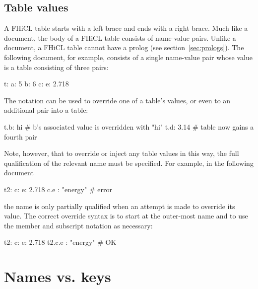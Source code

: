 \documentclass{memarticle}
\newcommand{\fhicl}{FHiCL\xspace}
\begin{document}
\section{Table values}

A \fhicl table starts with a left brace and ends with a right brace.
Much like a document, the body of a \fhicl table consists of
name-value pairs.  Unlike a document, a \fhicl table cannot have a
prolog (see section~\ref{sec:prologs}).  The following document, for example, consists of a single
name-value pair whose value is a table consisting of three pairs:
%
\Needspace{0.67in}
\begin{fcllisting}[texcl,escapechar=`]
t: {
   a: 5
   b: 6
   c: { e: 2.718 }
}
\end{fcllisting}

The  notation can be used to override one of a table's values,
or even to  an additional pair into a table:
%
\Needspace{0.34in}
\begin{fcllisting}[texcl,escapechar=`]
t.b: hi    # b's associated value is overridden with "hi"
t.d: 3.14  # table now gains a fourth pair
\end{fcllisting}

Note, however, that to override or inject any table values in this
way, the full qualification of the relevant name must be specified.
For example, in the following document
%
\Needspace{0.34in}
\begin{fcllisting}[texcl,escapechar=`]
t2: {
   c: { e: 2.718 }
   c.e : "energy"     # error
}
\end{fcllisting}
the name  is only partially qualified when an attempt is
made to override its value.  The correct override syntax is to start
at the outer-most name and to use the member and subscript notation as
necessary:
%
\Needspace{0.34in}
\begin{fcllisting}[texcl,escapechar=`]
t2: { c: { e: 2.718 } }
t2.c.e : "energy"     # OK
\end{fcllisting}

\chapter{Names vs. keys}
\end{document}
